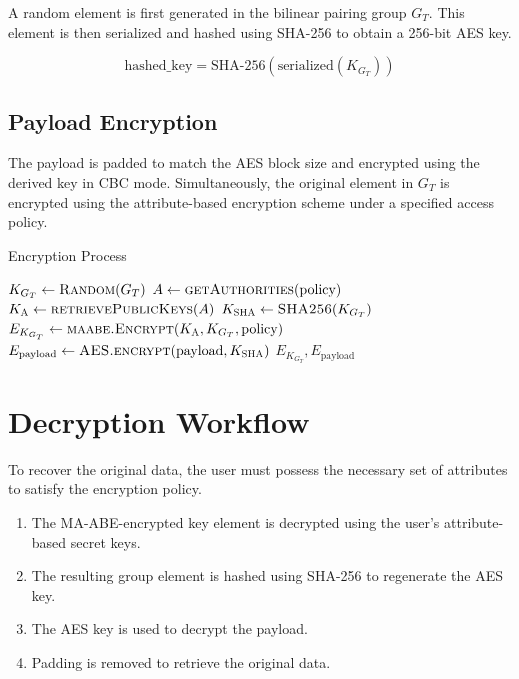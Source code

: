 \documentclass[cic,tc,english]{iiufrgs}
\begin{document}
            A random element is first generated in the bilinear pairing group $G_T$. This element is then serialized and hashed using SHA-256 to obtain a 256-bit AES key.

            \begin{equation}
            \text{hashed\_key} = \text{SHA-256}(\text{serialized}(K_{G_T}))
            \end{equation}

        \subsection{Payload Encryption}

            The payload is padded to match the AES block size and encrypted using the derived key in CBC mode. Simultaneously, the original element in $G_T$ is encrypted using the attribute-based encryption scheme under a specified access policy.

            \begin{algorithm}
                \caption{Encryption Process}
                \label{alg:encryption_process}
                \scriptsize
                \begin{algorithmic}[1]
                    \State $K_{G_T} \gets \textsc{Random}(G_T)$
                    \State $A \gets \textsc{getAuthorities}(\text{policy})$
                    \State $K_{\textsc{A}} \gets \textsc{retrievePublicKeys}(A)$
                    \State $K_{\textsc{SHA}} \gets \textsc{SHA256}(K_{G_T})$
                    \State $E_{K_{G_T}} \gets \textsc{maabe.Encrypt}(K_{\textsc{A}}, K_{G_T}, \text{policy})$
                    \State $E_{\text{payload}} \gets \textsc{AES.encrypt}(\text{payload}, K_{\textsc{SHA}})$
                    \State \Return $E_{K_{G_T}}, E_{\text{payload}}$
                \EndProcedure
                \end{algorithmic}
            \end{algorithm}

    \section{Decryption Workflow}
    \label{sec:decryption-workflow}

        To recover the original data, the user must possess the necessary set of attributes to satisfy the encryption policy.
        

        \begin{enumerate}
            \item The MA-ABE-encrypted key element is decrypted using the user's attribute-based secret keys.
            \item The resulting group element is hashed using SHA-256 to regenerate the AES key.
            \item The AES key is used to decrypt the payload.
            \item Padding is removed to retrieve the original data.
        \end{enumerate}
\end{document}
